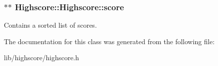 \subsubsection[{\texorpdfstring{score}{score}}]{$\ast$$\ast$ Highscore\+::\+Highscore\+::score\hspace{0.3cm}{\ttfamily [private]}}\hypertarget{class_highscore_1_1_highscore_a569a403dc24a8fa67efd7065148f4c9d}{}\label{class_highscore_1_1_highscore_a569a403dc24a8fa67efd7065148f4c9d}
Contains a sorted list of scores. 

The documentation for this class was generated from the following file\+:\begin{DoxyCompactItemize}
\item 
lib/highscore/highscore.\+h\end{DoxyCompactItemize}
